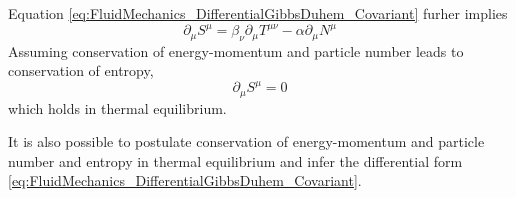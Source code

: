 Equation \eqref{eq:FluidMechanics_DifferentialGibbsDuhem_Covariant} furher implies 
\begin{equation}
    \partial_\mu S^\mu=\beta_\nu\partial_\mu T^{\mu\nu}-\alpha\partial_\mu N^\mu
\end{equation}
Assuming conservation of energy-momentum and particle number leads to conservation of entropy,
\begin{equation}
    \partial_\mu S^\mu=0
\end{equation}
which holds in thermal equilibrium.

It is also possible to postulate conservation of energy-momentum and particle number and entropy in thermal equilibrium and infer the differential form \eqref{eq:FluidMechanics_DifferentialGibbsDuhem_Covariant}.



